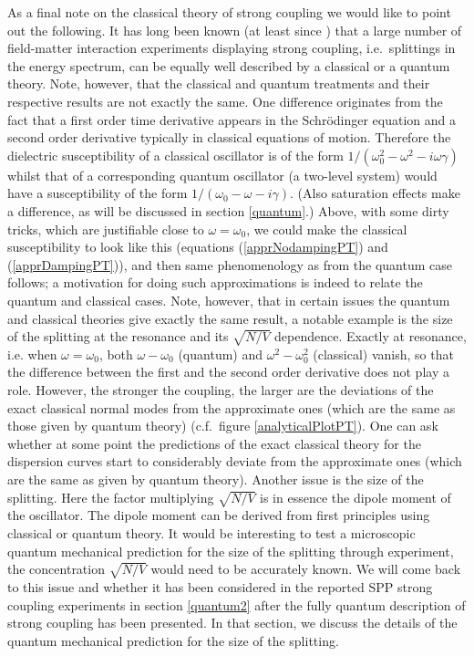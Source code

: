 \documentclass[12pt]{iopart}
\begin{document}
As a final note on the classical theory of strong coupling we would like to point out the following. It has long been known (at least since \cite{Zhu1990}) that a large number of field-matter interaction experiments displaying strong coupling, i.e.\ splittings in the energy spectrum, can be equally well described by a classical or a quantum theory. Note, however, that the classical and quantum treatments and their respective results are not exactly the same. One difference originates from the fact that a first order time derivative appears in the Schr\"odinger equation and a second order derivative typically in classical equations of motion. Therefore the dielectric susceptibility of a classical oscillator is of the form $1/(\omega_0^2-\omega^2-i\omega \gamma)$ whilst that of a corresponding quantum oscillator 
(a two-level system) would have a susceptibility of the form $1/(\omega_0-\omega-i\gamma)$. (Also saturation effects make 
a difference, as will be discussed in section \ref{quantum}.) Above, with some dirty tricks, which are justifiable close 
to $\omega=\omega_0$, we could make the classical susceptibility to look like this (equations (\ref{apprNodampingPT}) 
and (\ref{apprDampingPT})), and then same phenomenology as from the quantum case follows; a motivation for doing such 
approximations is indeed to relate the quantum and classical cases. Note, however, that in certain issues the quantum 
and classical theories give exactly the same result, a notable example is the size of the splitting at the resonance 
and its $\sqrt{N/V}$ dependence. Exactly at resonance, i.e. when $\omega=\omega_0$, both $\omega - \omega_0$ (quantum) 
and $\omega^2 - \omega_0^2$ (classical) vanish, so that the difference between the first and the second order derivative 
does not play a role. However, the stronger the coupling, the larger are the deviations of the exact classical normal 
modes from the approximate ones (which are the same as those given by quantum theory) 
(c.f.\ figure \ref{analyticalPlotPT}). One can ask whether at some point the predictions of the exact classical theory 
for the dispersion curves start to considerably deviate from the approximate ones (which are the same as given by quantum 
theory). Another issue is the size of the splitting. Here the factor multiplying $\sqrt{N/V}$ is in essence the dipole 
moment of the oscillator. The dipole moment can be derived from first principles using classical or quantum theory. 
It would be interesting to 
test a microscopic quantum mechanical prediction for the size of the splitting through experiment, 
the concentration $\sqrt{N/V}$ would need to be accurately known. 
We will come back to this issue and whether it has been considered in the reported SPP strong coupling experiments in 
section \ref{quantum2} after the fully quantum description of strong coupling has been presented. In that section, 
we discuss the details of the quantum mechanical prediction for the size of the splitting. 
\end{document}
